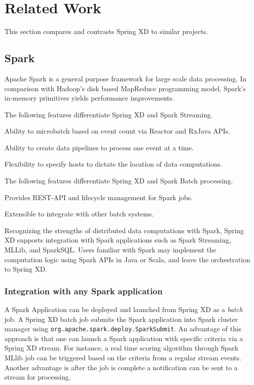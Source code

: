 \section{Related Work}
This section compares and contrasts Spring XD to similar projects.

\subsection{Spark}
\label{sec:Spark}
Apache Spark is a general purpose framework for large scale data processing.
In comparison with Hadoop's disk based MapReduce programming model, Spark's
in-memory primitives yields performance improvements.

The following features differentiate Spring XD and Spark Streaming.

\begin{itemize*}
\item Ability to microbatch based on event count via Reactor and RxJava APIs.
\item Ability to create data pipelines to process one event at a time.
\item Flexibility to specify hosts to dictate the location of data computations.
\end{itemize*}

The following features differentiate Spring XD and Spark Batch processing.

\begin{itemize*}
\item Provides REST-API and lifecycle management for Spark jobs.
\item Extensible to integrate with other batch systems.
\end{itemize*}

Recognizing the strengths of distributed data computations with Spark, Spring XD
supports integration with Spark applications such as Spark Streaming, MLLib, and
SparkSQL. Users familiar with Spark may implement the computation logic using
Spark APIs in Java or Scala, and leave the orchestration to Spring XD.

\subsubsection{Integration with any Spark application}
A Spark Application can be deployed and launched from Spring XD as
a \emph{batch} job. A Spring XD batch job submits the Spark application into
Spark cluster manager using \texttt{org.apache.spark.deploy.SparkSubmit}. An advantage
of this approach is that one can launch a Spark application with specific criteria
via a Spring XD stream. For instance, a real time scoring algorithm through Spark MLlib
job can be triggered based on the criteria from a regular stream events.
Another advantage is after the job is complete a notification can be sent to a
stream for processing.

